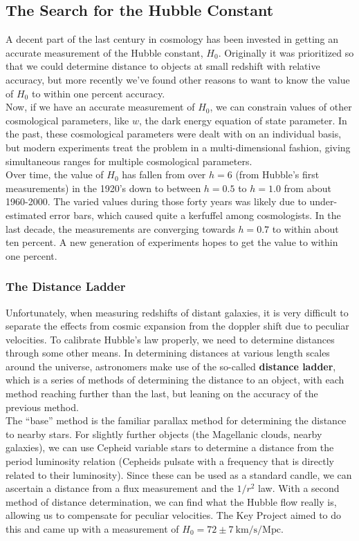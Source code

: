 \documentclass[10pt]{article}
\numberwithin{equation}{section}
\newcommand{\n}{\noindent}
\begin{document}
	\subsection{The Search for the Hubble Constant} %
	\label{sub:the_search_for_h_0_}
	A decent part of the last century in cosmology has been invested in getting an accurate measurement of the Hubble constant, $H_0$. Originally it was prioritized so that we could determine distance to objects at small redshift with relative accuracy, but more recently we've found other reasons to want to know the value of $H_0$ to within one percent accuracy.\\
	
	\n Now, if we have an accurate measurement of $H_0$, we can constrain values of other cosmological parameters, like $w$, the dark energy equation of state parameter. In the past, these cosmological parameters were dealt with on an individual basis, but modern experiments treat the problem in a multi-dimensional fashion, giving simultaneous ranges for multiple cosmological parameters.\\
	
	\n Over time, the value of $H_0$ has fallen from over $h=6$ (from Hubble's first measurements) in the 1920's down to between $h=0.5$ to $h=1.0$ from about 1960-2000. The varied values during those forty years was likely due to under-estimated error bars, which caused quite a kerfuffel among cosmologists. In the last decade, the measurements are converging towards $h=0.7$ to within about ten percent. A new generation of experiments hopes to get the value to within one percent.
	
	\subsubsection{The Distance Ladder} %
	\label{ssub:the_distance_ladder}
		Unfortunately, when measuring redshifts of distant galaxies, it is very difficult to separate the effects from cosmic expansion from the doppler shift due to peculiar velocities. To calibrate Hubble's law properly, we need to determine distances through some other means. In determining distances at various length scales around the universe, astronomers make use of the so-called \textbf{distance ladder}, which is a series of methods of determining the distance to an object, with each method reaching further than the last, but leaning on the accuracy of the previous method.\\
		
		\n The ``base'' method is the familiar parallax method for determining the distance to nearby stars. For slightly further objects (the Magellanic clouds, nearby galaxies), we can use Cepheid variable stars to determine a distance from the period luminosity relation (Cepheids pulsate with a frequency that is directly related to their luminosity). Since these can be used as a standard candle, we can ascertain a distance from a flux measurement and the $1/r^2$ law. With a second method of distance determination, we can find what the Hubble flow really is, allowing us to compensate for peculiar velocities. The Key Project aimed to do this and came up with a measurement of $H_0 = 72 \pm 7\ \mathrm{km/s/Mpc}$.
\end{document}
